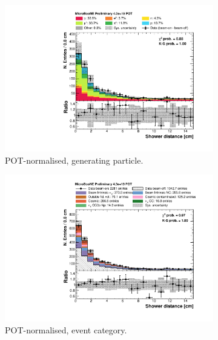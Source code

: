 \begin{figure}[htbp]
\centering
  \begin{subfigure}{0.49\textwidth}
    \includegraphics[width=\linewidth]{figures/h_shower_distance_pdg.pdf}
    \caption{POT-normalised, generating particle.} \label{fig:showerd_pdg}
  \end{subfigure}
  \begin{subfigure}{0.49\textwidth}
    \includegraphics[width=\linewidth]{figures/h_shower_distance.pdf}
    \caption{POT-normalised, event category.} \label{fig:showerd_pot}
  \end{subfigure}
  \begin{subfigure}{0.49\textwidth}

\end{subfigure}
\end{figure}
